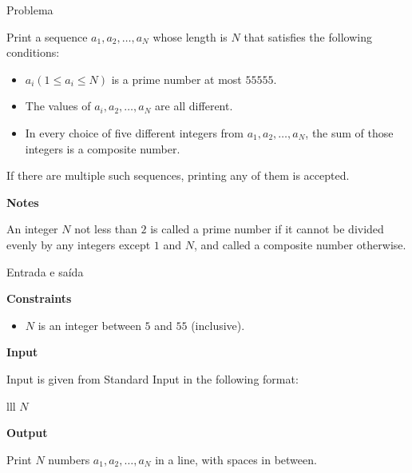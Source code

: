 \begin{frame}[fragile]{Problema}

Print a sequence $a_1, a_2, \ldots, a_N$ whose length is $N$ that satisfies the following conditions:
\begin{itemize}
    \item $a_i (1\leq a_i\leq N)$ is a prime number at most $55 555$.
    \item The values of $a_i, a_2, \ldots, a_N$ are all different.
    \item In every choice of five different integers from $a_1, a_2, \ldots, a_N$, the sum of those integers is a composite number.
\end{itemize}
 
If there are multiple such sequences, printing any of them is accepted.

\vspace{0.2in}

\textbf{Notes}

An integer $N$ not less than $2$ is called a prime number if it cannot be divided evenly by any integers except $1$ and $N$, and called a composite number otherwise.

\end{frame}

\begin{frame}[fragile]{Entrada e saída}

\textbf{Constraints}

\begin{itemize}
    \item $N$ is an integer between $5$ and $55$ (inclusive).
\end{itemize}

\vspace{0.1in}

\textbf{Input}

Input is given from Standard Input in the following format:
\begin{atcoderio}{lll}
$N$ \\
\end{atcoderio}

\textbf{Output}

Print $N$ numbers $a_1, a_2, \ldots, a_N$ in a line, with spaces in between.

\end{frame}

